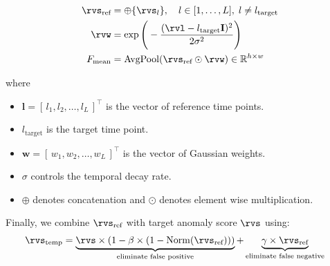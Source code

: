 
\begin{equation}
\label{eq:laf_fusion}
\begin{aligned}
    \rvs_{\text{ref}} &= \oplus \{\rvs_l\}, \quad l \in [1, \dots, L], \; l \neq l_{\text{target}} \\
    \rvw &= \exp\Bigg(-\frac{(\rvl - l_\text{target}\mathbf{I})^2}{2\sigma^2}\Bigg) \\
    F_{\text{mean}} &= \mathrm{AvgPool}(\rvs_{\text{ref}} \odot \rvw) \in \mathbb{R}^{h \times w} 
\end{aligned}
\end{equation}

where 
\begin{itemize}
    \item $\mathbf{l} = [\, l_1, l_2, \dots, l_L \,]^\top$ is the vector of reference time points.
    \item \(l_\text{target}\) is the target time point.  
    \item \(\mathbf{w} = [\, w_1, w_2, \dots, w_L \,]^\top\) is the vector of Gaussian weights. 
    \item \(\sigma\) controls the temporal decay rate.
    \item $\oplus$ denotes concatenation and $\odot$ denotes element wise multiplication. 
\end{itemize}

Finally, we combine $\rvs_{\textnormal{ref}}$ with target anomaly score $\rvs$ using: 
\begin{align}
    \rvs_{\text{temp}} &= \underbrace{\rvs \times (1 - \beta \times (1 - \mathrm{Norm}(\rvs_{\text{ref}})))}_{\text{eliminate false positive}} + \underbrace{\gamma \times \rvs_{\text{ref}}}_{\text{eliminate false negative}} \label{eq:temp-smooth}
\end{align}

